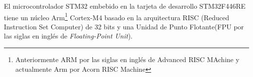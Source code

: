 El microcontrolador STM32 embebido en la tarjeta de desarrollo STM32F446RE tiene un núcleo Arm\footnote{Anteriormente ARM por las siglas en inglés de Advanced RISC MAchine y actualmente Arm por Acorn RISC Machine} Cortex-M4 basado en la  arquitectura RISC (Reduced Instruction Set Computer) de 32 bits y una Unidad de Punto Flotante(FPU por las siglas en inglés de \textit{Floating-Point Unit}). 






















